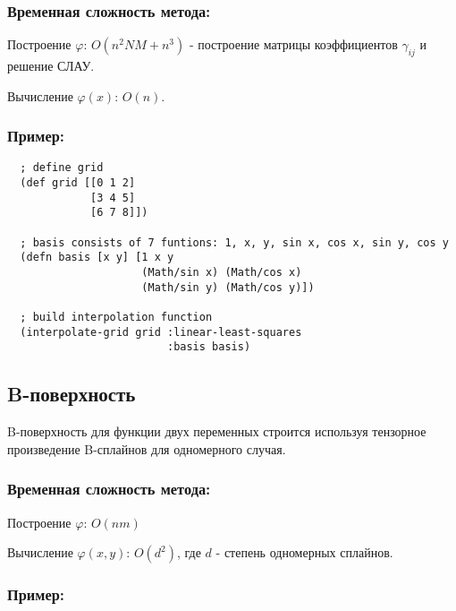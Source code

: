 \subsubsection{Временная сложность метода:}

Построение $\varphi$: $ O(n^2NM + n^3)$ - построение матрицы коэффициентов $\gamma_{ij}$ и решение СЛАУ.

Вычисление $\varphi(x)$: $O(n)$.

\subsubsection{Пример:}

\begin{verbatim}
  ; define grid
  (def grid [[0 1 2]
             [3 4 5]
             [6 7 8]])

  ; basis consists of 7 funtions: 1, x, y, sin x, cos x, sin y, cos y
  (defn basis [x y] [1 x y 
                     (Math/sin x) (Math/cos x) 
                     (Math/sin y) (Math/cos y)])

  ; build interpolation function
  (interpolate-grid grid :linear-least-squares
                         :basis basis)
\end{verbatim}



\subsection{B-поверхность}

B-поверхность для функции двух переменных строится используя тензорное произведение B-сплайнов для одномерного случая.

\subsubsection{Временная сложность метода:}

Построение $\varphi$: $O(n m)$

Вычисление $\varphi(x, y)$: $O(d^2)$, где $d$ - степень одномерных сплайнов.

\subsubsection{Пример:}






